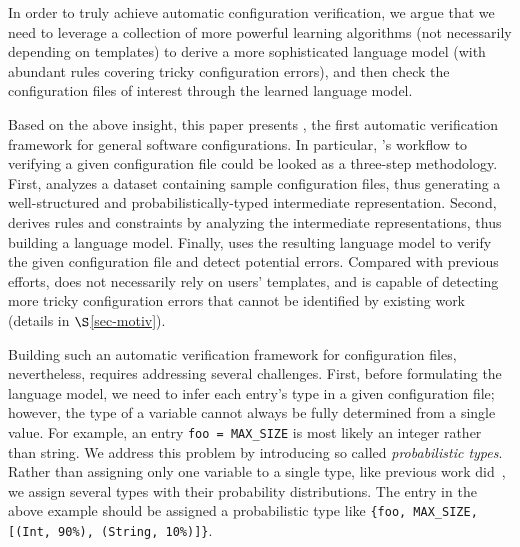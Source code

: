
In order to truly achieve automatic configuration verification,
we argue that we need to leverage a collection of more powerful learning 
algorithms (not necessarily depending on templates) to derive 
a more sophisticated language model (with abundant rules covering
tricky configuration errors), and then check the configuration files
of interest through the learned language model.

Based on the above insight, 
this paper presents \app, the first automatic verification framework
for general software configurations.
In particular, \app's workflow to verifying a given configuration file
could be looked as a three-step methodology.
First, \app analyzes a dataset containing sample configuration files,
thus generating a well-structured and probabilistically-typed 
intermediate representation.
Second, \app derives rules and constraints by analyzing
the intermediate representations, thus building a language model.
Finally, \app uses the resulting language model
to verify the given configuration file and detect potential errors.
Compared with previous efforts,
\app does not necessarily rely on users' templates, 
and is capable of detecting more tricky configuration errors that
cannot be identified by existing work (details in $\S$\ref{sec-motiv}). 

Building such an automatic verification framework for
configuration files, nevertheless, requires addressing several challenges. 
First, before formulating the language model, 
we need to infer each entry's type in a given configuration file;
however, the type of a variable cannot always be fully determined 
from a single value. 
For example, an entry {\tt foo = MAX\_SIZE} is most likely
an integer rather than string. We address this problem by introducing 
so called {\emph{probabilistic types}}.
Rather than assigning only one variable to a single type,
like previous work did~\cite{zhang14encore}, 
we assign several types with their probability distributions. 
The entry in the above example should be assigned 
a probabilistic type like 
{\tt \{foo, MAX\_SIZE, [(Int, 90\%), (String, 10\%)]\}}.

